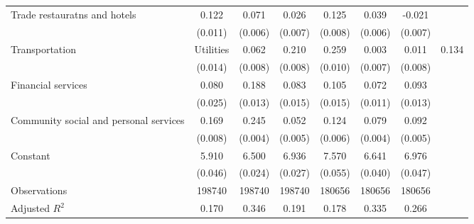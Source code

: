 \begin{table}[htbp]
\begin{tabular}{l*{6}{c}}
Trade restauratns and hotels&       0.122\sym{***}&       0.071\sym{***}&       0.026\sym{***}&       0.125\sym{***}&       0.039\sym{***}&      -0.021\sym{**} \\
                    &     (0.011)         &     (0.006)         &     (0.007)         &     (0.008)         &     (0.006)         &     (0.007)         \\
Transportation & Utilities&       0.062\sym{***}&       0.210\sym{***}&       0.259\sym{***}&       0.003         &       0.011         &       0.134\sym{***}\\
                    &     (0.014)         &     (0.008)         &     (0.008)         &     (0.010)         &     (0.007)         &     (0.008)         \\
Financial services  &       0.080\sym{**} &       0.188\sym{***}&       0.083\sym{***}&       0.105\sym{***}&       0.072\sym{***}&       0.093\sym{***}\\
                    &     (0.025)         &     (0.013)         &     (0.015)         &     (0.015)         &     (0.011)         &     (0.013)         \\
Community social and personal services&       0.169\sym{***}&       0.245\sym{***}&       0.052\sym{***}&       0.124\sym{***}&       0.079\sym{***}&       0.092\sym{***}\\
                    &     (0.008)         &     (0.004)         &     (0.005)         &     (0.006)         &     (0.004)         &     (0.005)         \\
Constant            &       5.910\sym{***}&       6.500\sym{***}&       6.936\sym{***}&       7.570\sym{***}&       6.641\sym{***}&       6.976\sym{***}\\
                    &     (0.046)         &     (0.024)         &     (0.027)         &     (0.055)         &     (0.040)         &     (0.047)         \\
\hline
Observations        &      198740         &      198740         &      198740         &      180656         &      180656         &      180656         \\
Adjusted \(R^{2}\)  &       0.170         &       0.346         &       0.191         &       0.178         &       0.335         &       0.266         \\
\hline\hline
\end{tabular}
\end{table}
